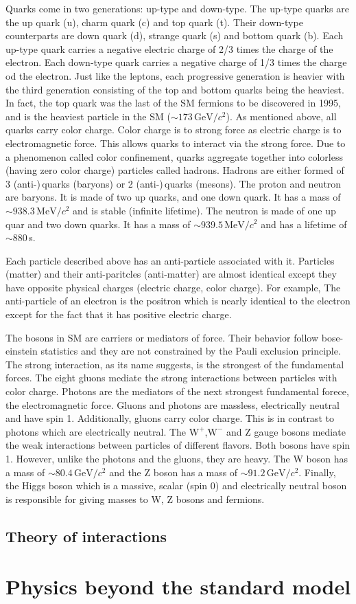 Quarks come in two generations: up-type and down-type. The up-type quarks are the up quark (u), charm quark (c) and top quark (t). Their down-type counterparts are down quark (d), strange quark (s) and bottom quark (b). Each up-type quark carries a negative electric charge of 2/3 times the charge of the electron. Each down-type quark carries a negative charge of 1/3 times the charge od the electron. Just like the leptons, each progressive generation is heavier with the third generation consisting of the top and bottom quarks being the heaviest. In fact, the top quark was the last of the SM fermions to be discovered in 1995, and is the heaviest particle in the SM ($\sim 173\,\mathrm{GeV}/c^2$). As mentioned above, all quarks carry color charge. Color charge is to strong force as electric charge is to electromagnetic force. This allows quarks to interact via the strong force. Due to a phenomenon called color confinement, quarks aggregate together into colorless (having zero color charge) particles called hadrons. Hadrons are either formed of 3 (anti-)\,quarks (baryons) or 2 (anti-)\,quarks (mesons). The proton and neutron are baryons. It is made of two up quarks, and one down quark. It has a mass of $\sim 938.3\,\mathrm{MeV}/c^2$ and is stable (infinite lifetime). The neutron is made of one up quar and two down quarks. It has a mass of $\sim 939.5\,\mathrm{MeV}/c^2$ and has a lifetime of $\sim880\,$s.

Each particle described above has an anti-particle associated with it. Particles (matter) and their anti-paritcles (anti-matter) are almost identical except they have opposite physical charges (electric charge, color charge). For example, The anti-particle of an electron is the positron which is nearly identical to the electron except for the fact that it has positive electric charge.

The bosons in SM are carriers or mediators of force. Their behavior follow bose-einstein statistics and they are not constrained by the Pauli exclusion principle. The strong interaction, as its name suggests, is the strongest of the fundamental forces. The eight gluons mediate the strong interactions between particles with color charge. Photons are the mediators of the next strongest fundamental forece, the electromagnetic force. Gluons and photons are massless, electrically neutral and have spin 1. Additionally, gluons carry color charge. This is in contrast to photons which are electrically neutral. The $\mathrm{W}^+$,$\mathrm{W}^-$ and Z gauge bosons mediate the weak interactions between particles of different flavors. Both bosons have spin 1. However, unlike the photons and the gluons, they are heavy. The W boson has a mass of $\sim 80.4\,\mathrm{GeV}/c^2$ and the Z boson has a mass of $\sim 91.2\,\mathrm{GeV}/c^2$. Finally, the Higgs boson which is a massive, scalar (spin 0) and electrically neutral boson is responsible for giving masses to W, Z bosons and fermions.         

\subsection{Theory of interactions}

\section{Physics beyond the standard model}
\label{sec:BSM}

